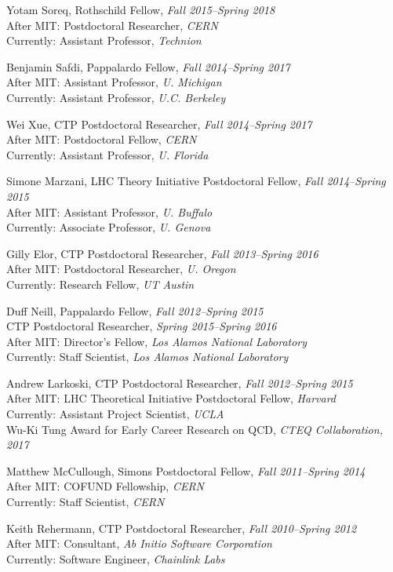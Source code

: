 \item Yotam Soreq, Rothschild Fellow, \emph{Fall 2015--Spring 2018}
\\ After MIT: Postdoctoral Researcher, \emph{CERN}
\\ Currently: Assistant Professor, \emph{Technion}

\item Benjamin Safdi, Pappalardo Fellow, \emph{Fall 2014--Spring 2017}
\\ After MIT: Assistant Professor, \emph{U. Michigan}
\\ Currently: Assistant Professor, \emph{U.C. Berkeley}

\item Wei Xue, CTP Postdoctoral Researcher, \emph{Fall 2014--Spring 2017}
\\ After MIT: Postdoctoral Fellow, \emph{CERN}
\\ Currently: Assistant Professor, \emph{U. Florida}

\item Simone Marzani, LHC Theory Initiative Postdoctoral Fellow, \emph{Fall 2014--Spring 2015}
\\ After MIT: Assistant Professor, \emph{U. Buffalo}
\\ Currently: Associate Professor, \emph{U. Genova}

\item Gilly Elor, CTP Postdoctoral Researcher, \emph{Fall 2013--Spring 2016}
\\ After MIT: Postdoctoral Researcher, \emph{U. Oregon}
\\ Currently: Research Fellow, \emph{UT Austin}

\item Duff Neill, Pappalardo Fellow, \emph{Fall 2012--Spring 2015}
\\ CTP Postdoctoral Researcher, \emph{Spring 2015--Spring 2016}
\\ After MIT: Director's Fellow, \emph{Los Alamos National Laboratory}
\\ Currently: Staff Scientist, \emph{Los Alamos National Laboratory}

\item Andrew Larkoski, CTP Postdoctoral Researcher, \emph{Fall 2012--Spring 2015}
\\ After MIT: LHC Theoretical Initiative Postdoctoral Fellow, \emph{Harvard}
\\ Currently: Assistant Project Scientist, \emph{UCLA}
\\ Wu-Ki Tung Award for Early Career Research on QCD, \emph{CTEQ Collaboration, 2017}

\item Matthew McCullough, Simons Postdoctoral Fellow, \emph{Fall 2011--Spring 2014}
\\ After MIT: COFUND Fellowship, \emph{CERN}
\\ Currently: Staff Scientist, \emph{CERN}

\item Keith Rehermann, CTP Postdoctoral Researcher, \emph{Fall 2010--Spring 2012}
\\ After MIT: Consultant, \emph{Ab Initio Software Corporation}
\\ Currently: Software Engineer, \emph{Chainlink Labs}

\el
